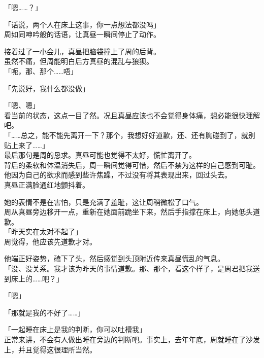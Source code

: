 「嗯……？」

「话说，两个人在床上这事，你一点想法都没吗」\\

周如同呻吟般的话语，让真昼一瞬间停止了动作。

接着过了一小会儿，真昼把脑袋撞上了周的后背。\\

虽然不痛，但周能明白后方真昼的混乱与狼狈。\\

「呃，那、那个……唔」

「先说好，我什么都没做」

「嗯、嗯」\\

看当前的状态，这点一目了然。况且真昼应该也不会觉得身体痛，想必能很快理解吧。\\

「……总之，能不能先离开一下？那个，我想好好道歉，还、还有胸碰到了，就别贴上来了……」\\

最后那句是周的恳求。真昼可能也觉得不太好，慌忙离开了。\\

背后的柔软和体温消失后，周一瞬间觉得可惜，然后不禁为这样的自己感到可耻。\\

他因为自己的欲求而感到些许焦躁，不过没有将其表现出来，回过头去。\\

真昼正满脸通红地颤抖着。

她的表情不是在害怕，只是充满了羞耻，这让周稍微松了口气。\\

周从真昼旁边移开一点，重新在她面前跪坐下来，然后手指撑在床上，向她低头道歉。\\

「昨天实在太对不起了」\\

周觉得，他应该先道歉才对。

他端正好姿势，磕下了头，然后感觉到头顶附近传来真昼慌乱的气息。\\

「没、没关系。我才该为昨天的事情道歉。那、那个，看这个样子，是周君把我送到床上的……吧？」

「嗯」

「那就是我的不好了……」

「一起睡在床上是我的判断，你可以吐槽我」\\

正常来讲，不会有人做出睡在旁边的判断吧。事实上，去年年底，周就睡在了沙发上，并且觉得这很理所当然。

